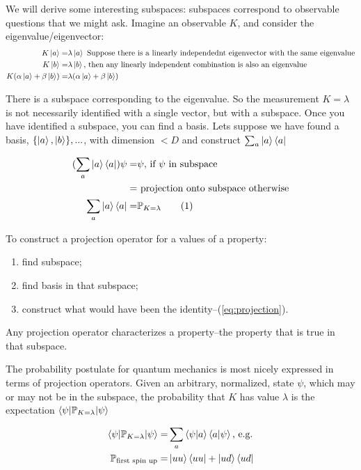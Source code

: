 \documentclass[]{article}
\newcommand\numberthis{\addtocounter{equation}{1}\tag{\theequation}}
\begin{document}
We will derive some interesting subspaces: subspaces correspond to observable questions that we might ask. Imagine an observable $K$, and consider the eigenvalue/eigenvector:
\begin{align*}
	K \ket{a} =& \lambda \ket{a} \text{ Suppose there is a linearly independednt eigenvector with the same eigenvalue}\\
	K \ket{b} =& \lambda \ket{b} \text{, then any linearly independent combination is also an eigenvalue}\\
	K(\alpha \ket{a} + \beta \ket{b}) =& \lambda (\alpha \ket{a} + \beta \ket{b})
\end{align*}

There is a subspace corresponding to the eigenvalue. So the measurement $K=\lambda$ is not necessarily identified with a single vector, but with a subspace. Once you have identified a subspace, you can find a basis. Lets suppose we have found a basis, $\{\ket{a}, \ket{b}\},...$, with dimension $<D$ and construct $\sum_a \ket{a} \bra{a}$

\begin{align*}
	(\sum_a \ket{a} \bra{a}) \psi =& \psi \text{, if $\psi$ in subspace}\\
	=& \text{ projection onto subspace otherwise}\\
	\sum_a \ket{a} \bra{a} =& \mathbb{P}_{K=\lambda} \numberthis \label{eq:projection}
\end{align*}

To construct a projection operator for a values of a property:
\begin{enumerate}
	\item find subspace;
	\item find basis in that subspace;
	\item construct what would have been the identity--(\ref{eq:projection}).
\end{enumerate}
Any projection operator characterizes a property--the property that is true in that subspace.

The probability postulate for quantum mechanics is most nicely expressed in terms of projection operators. Given an arbitrary, normalized, state $\psi$, which may or may not be in the subspace, the probability that $K$ has value $\lambda$ is the expectation $\braket{\psi\vert\mathbb{P}_{K=\lambda}\vert\psi}$

\begin{align*}
	\braket{\psi\vert\mathbb{P}_{K=\lambda}\vert\psi}=&\sum_a \braket{\psi\vert a}\braket{a \vert \psi} \text{, e.g.}\\
	\mathbb{P}_\text{first spin up}=&\ket{uu}\bra{uu} + \ket{ud}\bra{ud}
\end{align*}
\end{document}
